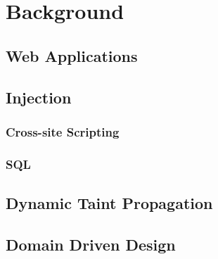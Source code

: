 \chapter{Background}


\section{Web Applications}

\section{Injection}
\subsection{Cross-site Scripting}
\subsection{SQL}

\section{Dynamic Taint Propagation}

\section{Domain Driven Design}